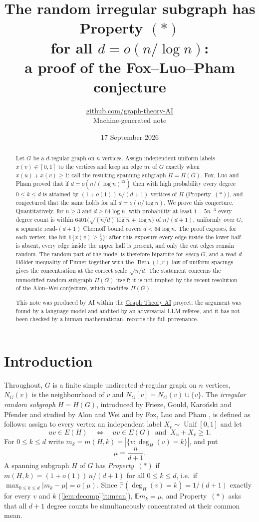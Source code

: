 \documentclass[11pt,a4paper]{article}
\title{The random irregular subgraph has Property $(\ast)$\\ for all $d=o(n/\log n)$:\\ a proof of the Fox--Luo--Pham conjecture}
\author{\href{https://github.com/graph-theory-AI}{github.com/graph-theory-AI}\\[2pt] \normalsize Machine-generated note}
\date{17 September 2026}
\theoremstyle{plain}
\theoremstyle{definition}
\theoremstyle{remark}
\newcommand{\EE}{\mathbb E}
\newcommand{\PP}{\mathbb P}
\newcommand{\ind}{\mathbf 1}
\newcommand{\Unif}{\operatorname{Unif}}
\newcommand{\Beta}{\operatorname{Beta}}
\newcommand{\degH}{\deg_H}
\begin{document}
\maketitle

\begin{abstract}
Let $G$ be a $d$-regular graph on $n$ vertices. Assign independent uniform labels $x(v)\in[0,1]$ to the vertices and keep an edge $uv$ of $G$ exactly when $x(u)+x(v)\ge1$; call the resulting spanning subgraph $H=H(G)$. Fox, Luo and Pham proved that if $d=o(n/(\log n)^{12})$ then with high probability every degree $0\le k\le d$ is attained by $(1+o(1))\,n/(d+1)$ vertices of $H$ (Property~$(\ast)$), and conjectured that the same holds for all $d=o(n/\log n)$. We prove this conjecture. Quantitatively, for $n\ge3$ and $d\ge64\log n$, with probability at least $1-5n^{-3}$ every degree count is within $6401\bigl(\sqrt{(n/d)\log n}+\log n\bigr)$ of $n/(d+1)$, uniformly over $G$; a separate read-$(d+1)$ Chernoff bound covers $d<64\log n$. The proof exposes, for each vertex, the bit $\ind\{x(v)\ge\tfrac12\}$: after this exposure every edge inside the lower half is absent, every edge inside the upper half is present, and only the cut edges remain random. The random part of the model is therefore bipartite for \emph{every} $G$, and a read-$d$ H\"older inequality of Finner together with the $\Beta(1,r)$ law of uniform spacings gives the concentration at the correct scale $\sqrt{n/d}$. The statement concerns the unmodified random subgraph $H(G)$ itself; it is not implied by the recent resolution of the Alon--Wei conjecture, which modifies $H(G)$.

\medskip\noindent\small
This note was produced by AI within the \href{https://github.com/graph-theory-AI/Graph-Theory-LLM-Proofs}{Graph Theory AI} project:
the argument was found by a language model and audited by an adversarial LLM
referee, and it has not been checked by a human mathematician.
 records the full provenance.
\end{abstract}

\section{Introduction}

Throughout, $G$ is a finite simple undirected $d$-regular graph on $n$ vertices, $N_G(v)$ is the neighbourhood of $v$ and $N_G[v]=N_G(v)\cup\{v\}$. The \emph{irregular random subgraph} $H=H(G)$, introduced by Frieze, Gould, Karo\'nski and Pfender \cite{FGKP02} and studied by Alon and Wei \cite{AW23} and by Fox, Luo and Pham \cite{FLP24}, is defined as follows: assign to every vertex an independent label $X_v\sim\Unif[0,1]$ and let
\[
 uv\in E(H)\quad\Longleftrightarrow\quad uv\in E(G)\ \text{ and }\ X_u+X_v\ge1 .
\]
For $0\le k\le d$ write $m_k=m(H,k)=|\{v:\degH(v)=k\}|$, and put
\[
 \mu=\frac n{d+1}.
\]
A spanning subgraph $H$ of $G$ has \emph{Property~$(\ast)$} if $m(H,k)=(1+o(1))\,n/(d+1)$ for all $0\le k\le d$, i.e.\ if $\max_{0\le k\le d}|m_k-\mu|=o(\mu)$. Since $\PP(\degH(v)=k)=1/(d+1)$ exactly for every $v$ and $k$ (\cref{lem:decomp}\ref{it:mean}), $\EE m_k=\mu$, and Property~$(\ast)$ asks that all $d+1$ degree counts be simultaneously concentrated at their common mean.
\end{document}
